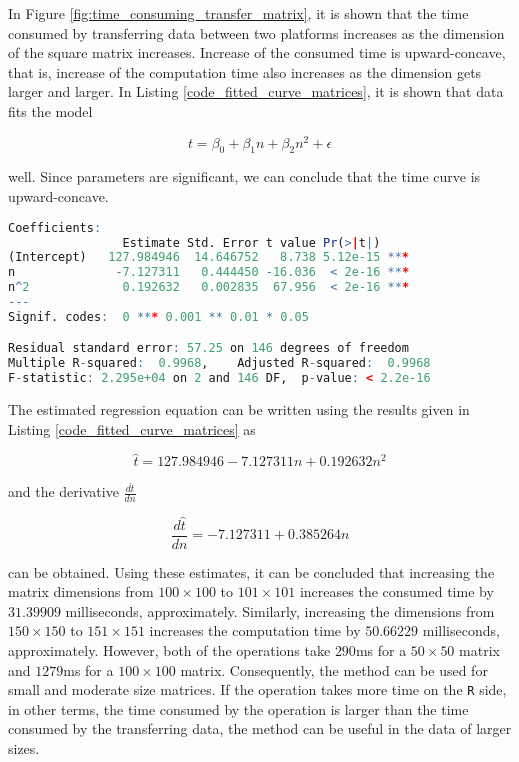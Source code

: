 \documentclass[10pt,a4paper, final, oneside]{article}
\begin{document}
In Figure \ref{fig:time_consuming_transfer_matrix}, it is shown that the time consumed by transferring data between two platforms increases as the dimension of the square matrix increases. Increase of the consumed time is upward-concave, that is, increase of the computation time also increases as the dimension gets larger and larger. In Listing \ref{code_fitted_curve_matrices}, it is shown that data fits the model

\begin{equation}
t = \beta_0 + \beta_1 n +  \beta_2 n^2 + \epsilon
\end{equation}

\noindent well. Since parameters are significant, we can conclude that the time curve is upward-concave. 

\begin{minipage}{\linewidth}
\begin{lstlisting}[language=R,frame=single,caption=Fitted Curve,label=code_fitted_curve_matrices]
Coefficients:
                Estimate Std. Error t value Pr(>|t|)    
(Intercept)   127.984946  14.646752   8.738 5.12e-15 ***
n              -7.127311   0.444450 -16.036  < 2e-16 ***
n^2             0.192632   0.002835  67.956  < 2e-16 ***
---
Signif. codes:  0 *** 0.001 ** 0.01 * 0.05 

Residual standard error: 57.25 on 146 degrees of freedom
Multiple R-squared:  0.9968,	Adjusted R-squared:  0.9968 
F-statistic: 2.295e+04 on 2 and 146 DF,  p-value: < 2.2e-16
\end{lstlisting}
\end{minipage}

The estimated regression equation can be written using the results given in Listing \ref{code_fitted_curve_matrices} as

\begin{equation}
\hat{t} = 127.984946 - 7.127311n + 0.192632n^2
\end{equation}

\noindent and the derivative $\frac{d \hat{t}}{dn}$ 

\begin{equation}
\frac{d \hat{t}}{dn} = - 7.127311 + 0.385264n
\end{equation}

\noindent can be obtained. Using these estimates, it can be concluded that increasing the matrix dimensions from $100 \times 100$ to $101 \times 101$ increases the consumed time by $31.39909$ milliseconds, approximately. Similarly, increasing the dimensions from $150 \times 150$ to $151 \times 151$ increases the computation time by $50.66229$ milliseconds, approximately. However, both of the operations take $290$ms for a $50 \times 50$ matrix and $1279$ms for a $100 \times 100$ matrix. Consequently, the method can be used for small and moderate size matrices. If the operation takes more time on the \texttt{R} side, in other terms, the time consumed by the operation is larger than the time consumed by the transferring data, the method can be useful in the data of larger sizes. 
\end{document}
